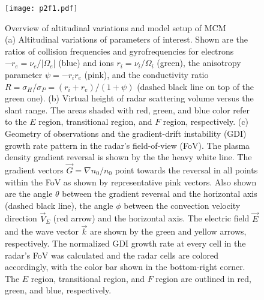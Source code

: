 \begin{figure}
	\centering
	\texttt{[image: p2f1.pdf]}
	\caption[Overview of altitudinal variations and model setup of MCM]{{\:}Overview of altitudinal variations and model setup of MCM\\ (a) Altitudinal variations of parameters of interest. Shown are the ratios of collision frequencies and gyrofrequencies for electrons \(-r_e=\nu_e/|\Omega_e|\) (blue) and ions \(r_i=\nu_i/\Omega_i\) (green), the anisotropy parameter \(\psi=-r_i r_e\) (pink), and the conductivity ratio \(R=\sigma_H/\sigma_P = \left(r_i+r_e\right)/\left(1+\psi\right)\) (dashed black line on top of the green one).  (b) Virtual height of radar scattering volume versus the slant range. The areas shaded with red, green, and blue color refer to the \(E\) region, transitional region, and \(F\) region, respectively. (c) Geometry of observations and the gradient-drift instability (GDI) growth rate pattern in the radar's field-of-view (FoV). The plasma density gradient reversal is shown by the the heavy white line. The gradient vectors \(\vec{G}=\nabla n_0/n_0\) point towards the reversal in all points within the FoV as shown by representative pink vectors. Also shown are the angle \(\theta\) between the gradient reversal and the horizontal axis (dashed black line),  the angle \(\phi\) between the convection velocity direction \(\vec{V}_E\) (red arrow) and the horizontal axis. The electric field \(\vec{E}\)  and the wave vector  \(\vec{k}\) are shown by the green and yellow arrows, respectively. The normalized GDI growth rate at every cell in the radar's FoV was calculated and the radar cells are colored accordingly, with the color bar shown in the bottom-right corner.  The \(E\) region, transitional region, and \(F\) region are outlined in red, green, and blue, respectively.}
	\label{fig:model_setup}
\end{figure}



